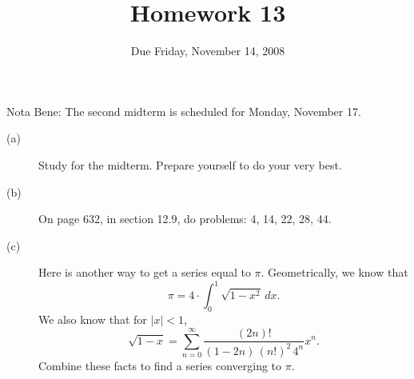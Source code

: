 \documentclass[12pt]{article}
\title{Homework 13}
\date{Due Friday, November 14, 2008}
\begin{document}
\maketitle

\begin{center}
{\sc Nota Bene:} The second midterm is scheduled for Monday, November 17.
\end{center}

\vfil

\begin{description}

\item[(a)] Study for the midterm.  Prepare yourself to do your very best.

\vfill

\item[(b)] On page 632, in section 12.9, do problems: 4, 14, 22, 28, 44.

\vfill

\item[(c)] Here is another way to get a series equal to $\pi$.  Geometrically, we know that
$$
\pi = 4 \cdot \int_0^1 \sqrt{1 - x^2} \, dx.
$$
We also know that for $|x| < 1$,
$$
\sqrt{1-x} = \sum_{n=0}^\infty \frac{(2n)!}{(1-2n) \, (n!)^2 \, 4^n}x^n.
$$
Combine these facts to find a series converging to $\pi$.

\vfill

\end{description}
\end{document}
